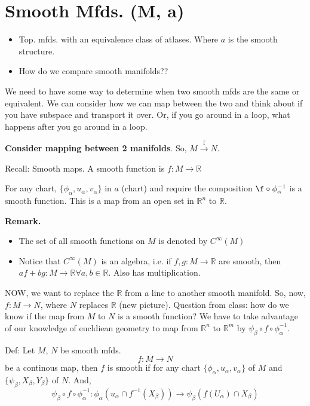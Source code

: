 \documentclass[12pt,letterpaper]{article}
\begin{document}
\section*{Smooth Mfds. (M, a)}
\begin{itemize}
    \item Top. mfds. with an equivalence class of atlases. Where $a$ is the smooth structure. 
    \item How do we compare smooth manifolds?? 
\end{itemize}

We need to have some way to determine when two smooth mfds are the same or equivalent. We can consider how we can map between the two and think about if you have subspace and transport it over. Or, if you go around in a loop, what happens after you go around in a loop.

\textbf{Consider mapping between 2 manifolds}. So, $M \xrightarrow{\text{f}} N$. 

Recall: Smooth maps. A smooth function is $f: M \rightarrow \mathbb{R}$ 

For any chart, $\{ \phi_{\alpha}, u_{\alpha}, v_{\alpha}\}$ in $a$ (chart) and require the composition $\f \circ \phi_{\alpha}^{-1}$ is a smooth function. This is a map from an open set in $\mathbb{R}^n$ to $\mathbb{R}$.

\textbf{Remark.} 
\begin{itemize}
    \item The set of all smooth functions on $M$ is denoted by $C^{\infty}(M)$
    \item Notice that $C^{\infty}(M)$ is an algebra, i.e. if $f,g: M \rightarrow \mathbb{R}$ are smooth, then $af + bg: M \rightarrow \mathbb{R} \forall a,b \in \mathbb{R}$. Also has multiplication.
\end{itemize}

NOW, we want to replace the $\mathbb{R}$ from a line to another smooth manifold. So, now, $f: M \rightarrow N$, where $N$ replaces $\mathbb{R}$ (new picture). Question from class: how do we know if the map from $M$ to $N$ is a smooth function? We have to take advantage of our knowledge of eucldiean geometry to map from $\mathbb{R}^n$ to $\mathbb{R}^m$ by $\psi_{\beta} \circ f \circ \phi_{\alpha}^{-1}$.

Def: Let $M$, $N$ be smooth mfds. 
\begin{equation}
    f: M \rightarrow N
\end{equation}
be a continous map, then $f$ is smooth if for any chart $\{ \phi_{\alpha}, u_{\alpha}, v_{\alpha}\}$ of $M$ and $\{ \psi_{\beta}, X_{\beta}, Y_{\beta}\}$ of $N$. And, 
\begin{equation}
    \psi_{\beta} \circ f \circ \phi_{\alpha}^{-1} : \phi_{\alpha} (u_{\alpha} \cap f^{-1}(X_{\beta})) \rightarrow \psi_{\beta}(f(U_{\alpha}) \cap X_{\beta})
\end{equation}
\end{document}
